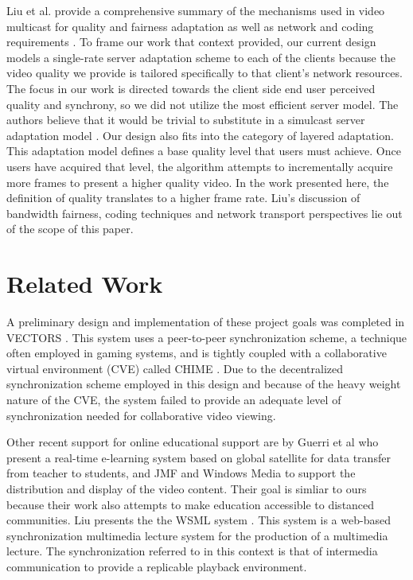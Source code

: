 \documentclass{sig-alternate}
\begin{document}
Liu et al. provide a comprehensive summary of the mechanisms used in
video multicast for quality and fairness adaptation as well as network
and coding requirements \cite{LIU}.  To frame our work that context
provided, our current design models a single-rate server adaptation
scheme to each of the clients because the video quality we provide is
tailored specifically to that client's network resources.  The focus
in our work is directed towards the client side end user perceived
quality and synchrony, so we did not utilize the most efficient server
model.  The authors believe that it would be trivial to substitute in
a simulcast server adaptation model \cite{simulcast}.  Our design also
fits into the category of layered adaptation.  This adaptation model
defines a base quality level that users must achieve.  Once users have
acquired that level, the algorithm attempts to incrementally acquire
more frames to present a higher quality video.  In the work presented
here, the definition of quality translates to a higher frame rate.
Liu's discussion of bandwidth fairness, coding techniques and network
transport perspectives lie out of the scope of this paper.

\section{Related Work} \label{related}

A preliminary design and implementation of these project goals was
completed in VECTORS \cite{VECTORS}.  This system uses a peer-to-peer
synchronization scheme, a technique often employed in gaming systems,
and is tightly coupled with a collaborative virtual environment (CVE)
called CHIME \cite{CHIME}.  Due to the decentralized synchronization
scheme employed in this design and because of the heavy weight nature
of the CVE, the system failed to provide an adequate level of
synchronization needed for collaborative video viewing.

Other recent support for online educational support are by Guerri et
al who present a real-time e-learning system based on global satellite
for data transfer from teacher to students, and JMF and Windows Media
\cite{GUERRI} to support the distribution and display of the video
content.  Their goal is simliar to ours because their work also
attempts to make education accessible to distanced communities.  Liu
presents the the WSML system \cite{LIU2}.  This system is a web-based
synchronization multimedia lecture system for the production of a
multimedia lecture.  The synchronization referred to in this context
is that of intermedia communication to provide a replicable playback
environment.
\end{document}
